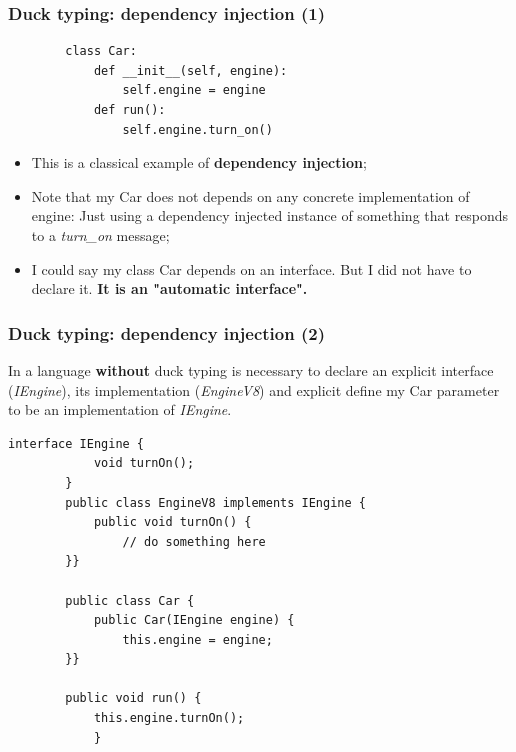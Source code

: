 \documentclass[xcolor ={table,usenames,dvipsnames}]{beamer}
\theoremstyle{definition}
\begin{document}
	\begin{frame}[fragile]
		\frametitle{Duck typing: dependency injection (1)}
		\begin{lstlisting}
		class Car:
			def __init__(self, engine):
				self.engine = engine
			def run():
				self.engine.turn_on()			
		\end{lstlisting}
		
		\begin{itemize}
			\item This is a classical example of \textbf{dependency injection};
			\item Note that my Car does not depends on any concrete implementation of engine: Just using a dependency injected instance of something that responds to a \textit{turn\_on} message;
			\item I could say my class Car depends on an interface. But I did not have to declare it. \textbf{It is an "automatic interface".}\\
		\end{itemize}	
	\end{frame}

	\begin{frame}[fragile]
		\frametitle{Duck typing: dependency injection (2)}
		In a language \textbf{without} duck typing is necessary to declare an explicit interface (\textit{IEngine}), its implementation (\textit{EngineV8}) and explicit define my Car parameter to be an implementation of \textit{IEngine}.	
		
		\begin{lstlisting}[basicstyle=\fontsize{2}{4}\selectfont\ttfamily\tiny]
		interface IEngine {
			void turnOn();
		}
		public class EngineV8 implements IEngine {
			public void turnOn() {
				// do something here
		}}
		
		public class Car {
			public Car(IEngine engine) {
				this.engine = engine;
		}}
		
		public void run() {
			this.engine.turnOn();
			}
		\end{lstlisting}
	\end{frame}

	

		
	
	

	
	
	
	
	
	
	
	
	
	
	
\end{document}
